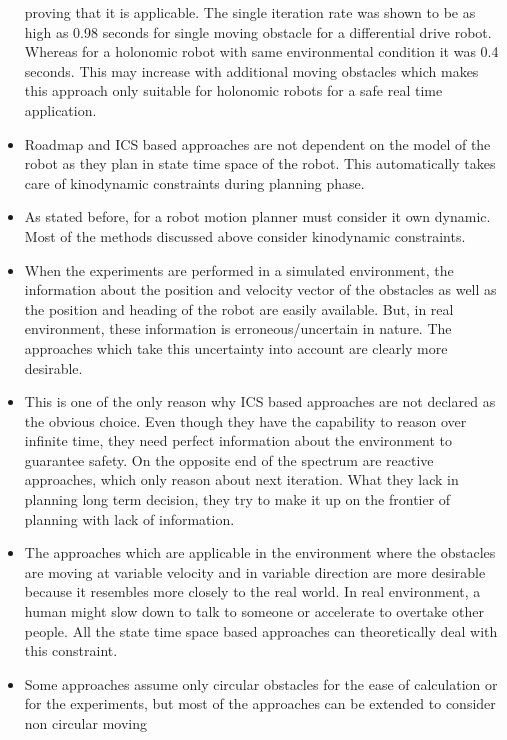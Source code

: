 \begin{itemize}
        proving that it is applicable. The single iteration rate was shown to be as high as 0.98 
        seconds for single moving obstacle for a differential drive robot. Whereas for a holonomic
        robot with same environmental condition it was 0.4 seconds. This may increase with 
        additional moving obstacles which makes this approach only suitable for holonomic robots
        for a safe real time application. 
    \item Roadmap and ICS based approaches are not dependent on the model of the robot as they 
        plan in state time space of the robot. This automatically takes care of kinodynamic 
        constraints during planning phase.
    \item As stated before, for a robot motion planner must consider it own dynamic\cite{fraichard2007short}. 
        Most of the methods discussed above consider kinodynamic constraints.
    \item When the experiments are performed in a simulated environment, the information about 
        the position and velocity vector of the obstacles as well as the position and heading of 
        the robot are easily available. But, in real environment, these information is 
        erroneous/uncertain in nature. The approaches which take this uncertainty into account are 
        clearly more desirable. 
    \item This is one of the only reason why ICS based approaches are not declared as the obvious 
        choice. Even though they have the capability to reason over infinite time, they need 
        perfect information about the environment to guarantee safety. On the opposite end of the 
        spectrum are reactive approaches, which only reason about next iteration. What they lack 
        in planning long term decision, they try to make it up on the frontier of planning with lack 
        of information.
    \item The approaches which are applicable in the environment where the obstacles are moving 
        at variable velocity and in variable direction are more desirable because it resembles more 
        closely to the real world. In real environment, a human might slow down to talk to someone 
        or accelerate to overtake other people. All the state time space based approaches can 
        theoretically deal with this constraint.
    \item Some approaches assume only circular obstacles for the ease of calculation or for the 
        experiments, but most of the approaches can be extended to consider non circular moving 

\end{itemize}
